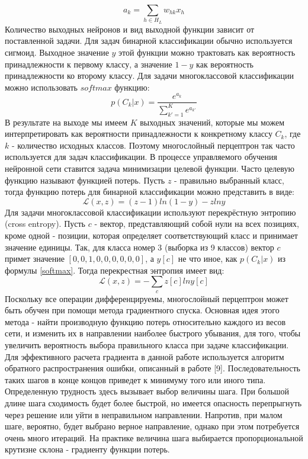     \begin{equation}
    a_{k}=\sum_{h\in  H_{L}}w_{hk}x_{h}
    \end{equation}
    Количество выходных нейронов и вид выходной функции зависит от поставленной задачи. Для задач бинарной классификации обычно используется сигмоид. Выходное значение $y$ этой функции можно трактовать как вероятность принадлежности к первому классу, а значение $1-y$ как вероятность принадлежности ко второму классу.
    Для задачи многоклассовой классификации можно использовать $softmax$ функцию:
    \begin{equation}\label{softmax}
    p(C_{k}|x)=\frac{e^{a_{k}}}{\sum_{k{}'=1}^{K}e^{a_{k{}'}}}
    \end{equation}
    В результате на выходе мы имеем $K$ выходных значений, которые мы можем интерпретировать как вероятности принадлежности к конкретному классу $C_{k}$, где $k$ - количество исходных классов. Поэтому многослойный перцептрон так часто используется для задач классификации. В процессе управляемого обучения нейронной сети ставится задача минимизации целевой функции.
    Часто целевую функцию называют функцией потерь. Пусть $z$ - правильно выбранный класс, тогда функцию потерь для бинарной классификации можно представить в виде:
    \begin{equation}
    \mathcal{L}(x,z) = (z-1)ln(1-y)-zlny
    \end{equation}
    Для задачи многоклассовой классификации используют перекрёстную энтропию (cross entropy). Пусть $c$ - вектор, представляющий собой нули на всех позициях, кроме одной - позиции, которая определяет соответствующий класс и принимает значение единицы. Так, для класса номер 3 (выборка из 9 классов) вектор $c$ примет значение $[0,0,1,0,0,0,0,0,0]$, а $y[c]$ не что иное, как $p(C_{k}|x)$ из формулы \ref{softmax}. Тогда перекрестная энтропия имеет вид:
    \begin{equation}
    \mathcal{L}(x,z) = -\sum_{c}{z[c] ln y[c]}
    \end{equation}
    Поскольку все операции дифференцируемы, многослойный перцептрон может быть обучен при помощи метода градиентного спуска. Основная идея этого метода - найти производную функцию потерь относительно каждого из весов сети, и изменить их в направлении наиболее быстрого убывания, для того, чтобы увеличить вероятность выбора правильного класса при задаче классификации.
    Для эффективного расчета градиента в данной работе используется алгоритм обратного распространения ошибки, описанный в работе [9]. Последовательность таких шагов в конце концов приведет к минимуму того или иного типа. Определенную трудность здесь вызывает выбор величины шага. При большой длине шага сходимость будет более быстрой, но имеется опасность пе­репрыгнуть через решение или уйти в неправильном направлении. Напротив, при малом шаге, вероятно, будет выбрано верное на­правление, однако при этом потребуется очень много итераций. На практике величина шага выбирается пропорциональной крутизне склона - градиенту функции потерь.

